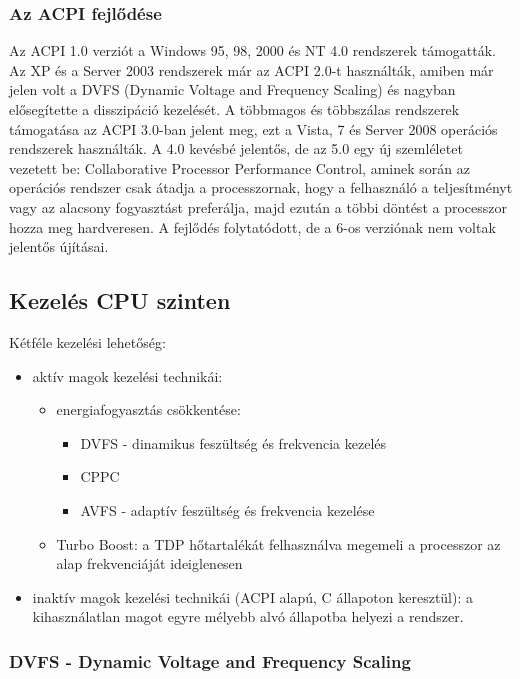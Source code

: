 \subsubsection{Az ACPI fejlődése}
Az ACPI 1.0 verziót a Windows 95, 98, 2000 és NT 4.0 rendszerek támogatták.
Az XP és a Server 2003 rendszerek már az ACPI 2.0-t használták, amiben már jelen volt a DVFS (Dynamic Voltage and Frequency Scaling) és nagyban elősegítette a disszipáció kezelését.
A többmagos és többszálas rendszerek támogatása az ACPI 3.0-ban jelent meg, ezt a Vista, 7 és Server 2008 operációs rendszerek használták.
A 4.0 kevésbé jelentős, de az 5.0 egy új szemléletet vezetett be: Collaborative Processor Performance Control, aminek során az operációs rendszer csak átadja a processzornak, hogy a felhasználó a teljesítményt vagy az alacsony fogyasztást preferálja, majd ezután a többi döntést a processzor hozza meg hardveresen.
A fejlődés folytatódott, de a 6-os verziónak nem voltak jelentős újításai.

\subsection{Kezelés CPU szinten}
Kétféle kezelési lehetőség:
\begin{itemize}
    \item aktív magok kezelési technikái:
    \begin{itemize}
        \item energiafogyasztás csökkentése:
        \begin{itemize}
            \item DVFS - dinamikus feszültség és frekvencia kezelés
            \item CPPC
            \item AVFS - adaptív feszültség és frekvencia kezelése
        \end{itemize}
        \item Turbo Boost: a TDP hőtartalékát felhasználva megemeli a processzor az alap frekvenciáját ideiglenesen
    \end{itemize}
    \item inaktív magok kezelési technikái (ACPI alapú, C állapoton keresztül): a kihasználatlan magot egyre mélyebb alvó állapotba helyezi a rendszer.
\end{itemize}

\subsubsection{DVFS - Dynamic Voltage and Frequency Scaling}
